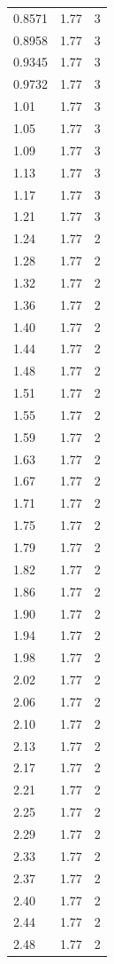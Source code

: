 \begin{longtable}{lrr}
  0.8571 & 1.77 & 3 \\
  0.8958 & 1.77 & 3 \\
  0.9345 & 1.77 & 3 \\
  0.9732 & 1.77 & 3 \\
  1.01 & 1.77 & 3 \\
  1.05 & 1.77 & 3 \\
  1.09 & 1.77 & 3 \\
  1.13 & 1.77 & 3 \\
  1.17 & 1.77 & 3 \\
  1.21 & 1.77 & 3 \\
  1.24 & 1.77 & 2 \\
  1.28 & 1.77 & 2 \\
  1.32 & 1.77 & 2 \\
  1.36 & 1.77 & 2 \\
  1.40 & 1.77 & 2 \\
  1.44 & 1.77 & 2 \\
  1.48 & 1.77 & 2 \\
  1.51 & 1.77 & 2 \\
  1.55 & 1.77 & 2 \\
  1.59 & 1.77 & 2 \\
  1.63 & 1.77 & 2 \\
  1.67 & 1.77 & 2 \\
  1.71 & 1.77 & 2 \\
  1.75 & 1.77 & 2 \\
  1.79 & 1.77 & 2 \\
  1.82 & 1.77 & 2 \\
  1.86 & 1.77 & 2 \\
  1.90 & 1.77 & 2 \\
  1.94 & 1.77 & 2 \\
  1.98 & 1.77 & 2 \\
  2.02 & 1.77 & 2 \\
  2.06 & 1.77 & 2 \\
  2.10 & 1.77 & 2 \\
  2.13 & 1.77 & 2 \\
  2.17 & 1.77 & 2 \\
  2.21 & 1.77 & 2 \\
  2.25 & 1.77 & 2 \\
  2.29 & 1.77 & 2 \\
  2.33 & 1.77 & 2 \\
  2.37 & 1.77 & 2 \\
  2.40 & 1.77 & 2 \\
  2.44 & 1.77 & 2 \\
  2.48 & 1.77 & 2 \\

\end{longtable}
